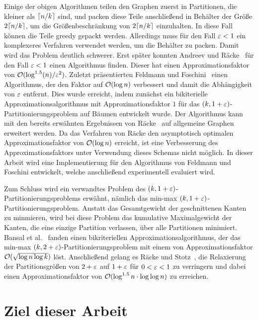 Einige der obigen Algorithmen teilen den Graphen zuerst in Partitionen, die kleiner als $\lceil n/k\rceil$ sind, und packen diese Teile anschließend in Behälter der Größe $2 \lceil n/k\rceil$, um die Größenbeschränkung von $2 \lceil n/k\rceil$ einzuhalten.
In diese Fall können die Teile greedy gepackt werden.
Allerdings muss für den Fall $\varepsilon < 1$ ein komplexeres Verfahren verwendet werden, um die Behälter zu packen. 
Damit wird das Problem deutlich schwerer.
Erst später konnten Andreev und Räcke~\cite{ar06} für den Fall $\varepsilon < 1$ einen Algorithmus finden.
Dieser hat einen Approximationsfaktor von $\mathcal{O}(\log^{1.5}(n)/\varepsilon^2)$.
Zuletzt präsentierten Feldmann und Foschini~\cite{FF15} einen Algorithmus, der den Faktor auf $\mathcal{O}(\log n)$ verbessert und damit die Abhängigkeit von $\varepsilon$ entfernt.
Dies wurde erreicht, indem zunächst ein bikiterielle Approximationsalgorithmus mit Approximationsfaktor $1$ für das $(k,1+\varepsilon)$\hyp Partitionierungsproblem auf Bäumen entwickelt wurde.
Der Algorithmus kann mit den bereits erwähnten Ergebnissen von Räcke~\cite{rc08} auf allgemeine Graphen erweitert werden.
Da das Verfahren von Räcke den asymptotisch optimalen Approximationsfaktor von $\mathcal{O}(\log n)$ erreicht, ist eine Verbesserung des Approximationsfaktors unter Verwendung dieses Schemas nicht möglich.
In dieser Arbeit wird eine Implementierung für den Algorithmus von Feldmann und Foschini entwickelt, welche anschließend experimentell evaluiert wird.

Zum Schluss wird ein verwandtes Problem des $(k, 1+\varepsilon)$\hyp Partitionierungsproblems erwähnt, nämlich das min-max $(k, 1+\varepsilon)$\hyp Partitionierungsproblem.
Anstatt das Gesamtgewicht der geschnittenen Kanten zu minmieren, wird bei diese Problem das kumulative Maximalgewicht der Kanten, die eine einzige Partition verlassen, über alle Partitionen minimiert.
Bansal et al.~\cite{BFK+11} fanden einen bikriteriellen Approximationsalgorithmus, der das min-max $(k, 2 + \varepsilon)$\hyp Partitionierungsproblem mit einem von Approximationsfaktor $\mathcal{O}(\sqrt{\log n \log k})$ löst.
Anschließend gelang es Räcke und Stotz~\cite{RS16}, die Relaxierung der Partitionsgrößen von $2 + \varepsilon$ auf $1 + \varepsilon$ für $0 < \varepsilon < 1$ zu verringern und dabei einen Approximationsfaktor von $\mathcal{O}(\log^{1.5} n \cdot \log \log n)$ zu erreichen.

\section{Ziel dieser Arbeit}
